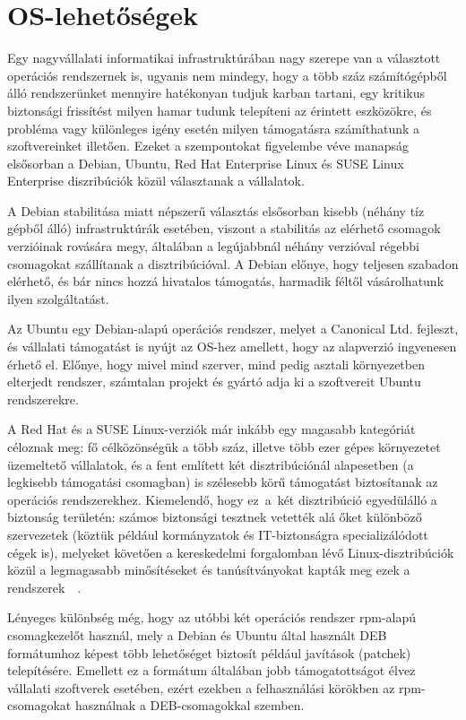 \section{OS-lehetőségek} \label{sect:os}
Egy nagyvállalati informatikai infrastruktúrában nagy szerepe van a választott operációs rendszernek is, ugyanis nem mindegy, hogy a több száz számítógépből álló rendszerünket mennyire hatékonyan tudjuk karban tartani, egy kritikus biztonsági frissítést milyen hamar tudunk telepíteni az érintett eszközökre, és probléma vagy különleges igény esetén milyen támogatásra számíthatunk a szoftvereinket illetően.
Ezeket a szempontokat figyelembe véve manapság elsősorban a Debian, Ubuntu, Red Hat Enterprise Linux és SUSE Linux Enterprise diszribúciók közül választanak a vállalatok.

A Debian stabilitása miatt népszerű választás elsősorban kisebb (néhány tíz gépből álló) infrastruktúrák esetében, viszont a stabilitás az elérhető csomagok verzióinak rovására megy, általában a legújabbnál néhány verzióval régebbi csomagokat szállítanak a disztribúcióval. A Debian előnye, hogy teljesen szabadon elérhető, és bár nincs hozzá hivatalos támogatás, harmadik féltől vásárolhatunk ilyen szolgáltatást.

Az Ubuntu egy Debian-alapú operációs rendszer, melyet a Canonical Ltd. fejleszt, és vállalati támogatást is nyújt az OS-hez amellett, hogy az alapverzió ingyenesen érhető el. Előnye, hogy mivel mind szerver, mind pedig asztali környezetben elterjedt rendszer, számtalan projekt és gyártó adja ki a szoftvereit Ubuntu rendszerekre.

A Red Hat és a SUSE Linux-verziók már inkább egy magasabb kategóriát céloznak meg: fő célközönségük a több száz, illetve több ezer gépes környezetet üzemeltető vállalatok, és a fent említett két disztribúciónál alapesetben (a legkisebb támogatási csomagban) is szélesebb körű támogatást biztosítanak az operációs rendszerekhez. Kiemelendő, hogy ez~a~két disztribúció egyedülálló a biztonság területén: számos biztonsági tesztnek vetették alá őket különböző szervezetek (köztük például kormányzatok és IT-biztonságra specializálódott cégek is), melyeket követően a kereskedelmi forgalomban lévő Linux-disztribúciók közül a legmagasabb minősítéseket és tanúsítványokat kapták meg ezek a rendszerek~\cite{RhSec}~\cite{SlesSec}.

Lényeges különbség még, hogy az utóbbi két operációs rendszer \acrshort{rpm}-alapú csomagkezelőt használ, mely a Debian és Ubuntu által használt DEB formátumhoz képest több lehetőséget biztosít például javítások (patchek) telepítésére. Emellett ez a formátum általában jobb támogatottságot élvez vállalati szoftverek esetében, ezért ezekben a felhasználási körökben az \acrshort{rpm}-csomagokat használnak a DEB-csomagokkal szemben.


